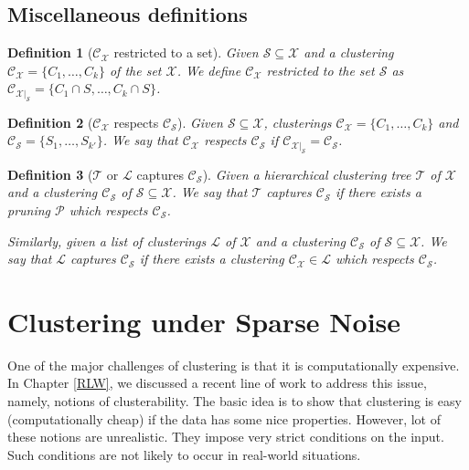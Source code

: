 \documentclass[letterpaper,12pt,titlepage,oneside,final]{book}
\newtheorem{definition}{Definition}
\newcommand{\mc}{\mathcal}
\begin{document}
\section{Miscellaneous definitions}
\begin{definition}[$\mc C_{\mc X}$ restricted to a set] Given $\mc S \subseteq \mc X$ and a clustering $\mc C_{\mc X} = \{C_1, \ldots, C_k\}$ of the set $\mc X$. We define $\mc C_{\mc X}$ restricted to the set $\mc S$ as $\mc C_{{\mc X}|_{\mc S}} = \{C_1 \cap S, \ldots, C_k \cap S\}$. 
\end{definition}

\begin{definition}[$\mc C_{\mc X}$ respects $\mc C_{\mc S}$] Given $\mc S \subseteq \mc X$, clusterings $\mc C_{\mc X} = \{C_1, \ldots, C_k\}$ and $\mc C_{\mc S} = \{S_1, \ldots, S_{k'}\}$. We say that $\mc C_{\mc X}$ respects $\mc C_{\mc S}$ if $\mc C_{{\mc X}|_{\mc S}} = \mc C_{\mc S}$.
\end{definition}

\begin{definition}[$\mc T$ or $\mc L$ captures $\mc C_{\mc S}$]Given a hierarchical clustering tree $\mc T$ of $\mc X$ and a clustering $\mc C_{\mc S}$ of $\mc S \subseteq \mc X$.  We say that $\mc T$ captures $\mc C_{\mc S}$ if there exists a pruning $\mc P$ which respects $\mc C_{\mc S}$. 

Similarly, given a list of clusterings $\mc L$ of $\mc X$ and a clustering $\mc C_{\mc S}$ of $\mc S \subseteq \mc X$. We say that $\mc L$ captures $\mc C_{\mc S}$ if there exists a clustering $\mc C_{\mc X} \in \mc L$ which respects $\mc C_{\mc S}$. 
\end{definition}






 
\chapter{Clustering under Sparse Noise}
\label{ANALYSIS}
One of the major challenges of clustering is that it is computationally expensive. In Chapter \ref{RLW}, we discussed a recent line of work to address this issue, namely, notions of clusterability. The basic idea is to show that clustering is easy (computationally cheap) if the data has some nice properties. However, lot of these notions are unrealistic. They impose very strict conditions on the input. Such conditions are not likely to occur in real-world situations. 
\end{document}
